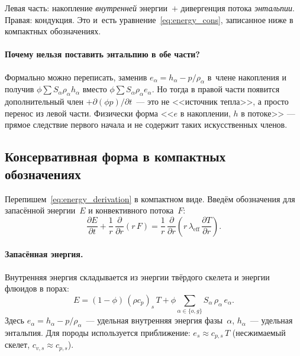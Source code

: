 \documentclass[12pt,a4paper]{article}
\begin{document}
Левая часть: накопление \emph{внутренней} энергии~$+$ дивергенция
потока \emph{энтальпии}. Правая: кондукция. Это и~есть
уравнение~\eqref{eq:energy_cons}, записанное ниже в компактных
обозначениях.

\paragraph{Почему нельзя поставить энтальпию в обе части?}
Формально можно переписать, заменив $e_\alpha = h_\alpha - p/\rho_\alpha$
в~члене накопления и получив $\phi\sum S_\alpha\rho_\alpha h_\alpha$
вместо $\phi\sum S_\alpha\rho_\alpha e_\alpha$. Но тогда в правой
части появится дополнительный член $+\partial(\phi p)/\partial t$~---
это не <<источник тепла>>, а просто перенос из левой части. Физически
форма <<$e$ в накоплении, $h$ в потоке>> --- прямое следствие первого
начала и не содержит таких искусственных членов.

\subsection{Консервативная форма в компактных обозначениях}%
\label{ssec:energy_conservative}

Перепишем~\eqref{eq:energy_derivation} в компактном виде. Введём
обозначения для запасённой энергии~$E$ и конвективного потока~$F$:
\begin{equation}\label{eq:energy_cons}
  \frac{\partial E}{\partial t}
  + \frac{1}{r}\,\frac{\partial}{\partial r}\!\left(r\,F\right)
  = \frac{1}{r}\,\frac{\partial}{\partial r}\!\left(
      r\,\lambda_{\mathrm{eff}}\,\frac{\partial T}{\partial r}
    \right).
\end{equation}

\paragraph{Запасённая энергия.}
Внутренняя энергия складывается из энергии твёрдого скелета и энергии
флюидов в порах:
\begin{equation}\label{eq:E_total}
  E = (1 - \phi)\,(\rho c_p)_s\,T
      + \phi\sum_{\alpha\in\{o,g\}} S_\alpha\,\rho_\alpha\,e_\alpha.
\end{equation}
Здесь $e_\alpha = h_\alpha - p/\rho_\alpha$~--- удельная внутренняя
энергия фазы~$\alpha$, $h_\alpha$~--- удельная энтальпия.
Для породы используется приближение: $e_s \approx c_{p,s}\,T$
(несжимаемый скелет, $c_{v,s} \approx c_{p,s}$).
\end{document}
